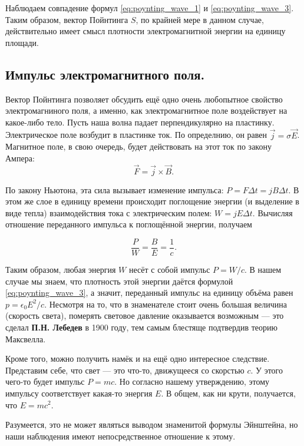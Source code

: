 \documentclass[12pt,a4paper]{article}
\numberwithin{equation}{section}
\numberwithin{equation}{section}
\newcommand{\eps}{\epsilon}
\begin{document}
Наблюдаем совпадение формул \eqref{eq:poynting_wave_1} и
\eqref{eq:poynting_wave_3}. Таким образом, вектор Пойнтинга $S$, по
крайней мере в данном случае, действительно имеет смысл плотности
электромагнитной энергии на единицу площади. 

\subsection{Импульс электромагнитного поля. }
\label{sec:field_momentum}

Вектор Пойнтинга позволяет обсудить ещё одно очень любопытное свойство
электромагниного поля, а именно, как электромагнитное поле
воздействует на какое-либо тело. Пусть наша волна падает
перпендикулярно на пластинку. Электрическое поле возбудит в пластинке
ток. По определнию, он равен $\vec{j} = \sigma \vec{E}$. Магнитное
поле, в свою очередь, будет действовать на этот ток по закону Ампера: 
\begin{equation}
  \label{eq:momentum_1}
  \vec{F} = \vec{j} \times \vec{B}.
\end{equation}

По закону Ньютона, эта сила вызывает изменение импульса: $P = F \Delta
t = j B \Delta t$. В этом же слое в единицу времени происходит
поглощение энергии (и выделение в виде тепла) взаимодействия тока с
электрическим полем: $W = j E \Delta t$. Вычисляя отношение
переданного импульса к поглощённой энергии, получаем

\begin{equation}
  \label{eq:momentum_2}
  \frac{P}{W}= \frac{B}{E} = \frac{1}{c}.
\end{equation}

Таким образом, любая энергия $W$ несёт с собой импульс $P=W/c$. В
нашем случае мы знаем, что плотность этой энергии даётся формулой
\eqref{eq:poynting_wave_3}, а значит, переданный импульс на единицу
объёма равен $p=\eps_0 E^2/c$. Несмотря на то, что в знаменателе стоит
очень большая величина (скорость света), померять световое давление
оказывается возможным --- это сделал \textbf{П.Н. Лебедев} в 1900
году, тем самым блестяще подтвердив теорию Максвелла. 

Кроме того, можно получить намёк и на ещё одно интересное
следствие. Представим себе, что свет --- это что-то, движущееся со
скорстью $c$. У этого чего-то будет импульс $P=mc$. Но согласно нашему
утверждению, этому импульсу соответствует какая-то энергия $E$. В
общем, как ни крути, получается, что $E=mc^2$.

Разумеется, это не может являться выводом знаменитой формулы
Эйнштейна, но наши наблюдения имеют непосредственное отношение к этому.
\end{document}

